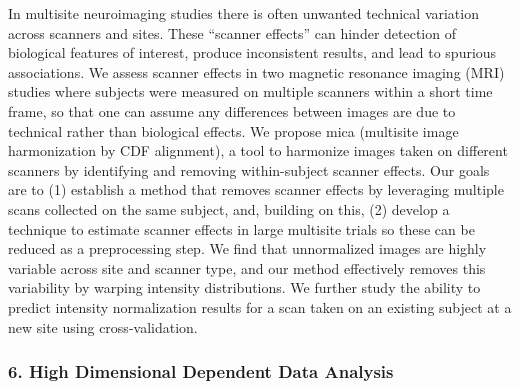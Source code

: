 \begin{itemize}
In multisite neuroimaging studies there is often unwanted technical variation across scanners and sites. These “scanner effects” can hinder detection of biological features of interest, produce inconsistent results, and lead to spurious associations. We assess scanner effects in two magnetic resonance imaging (MRI) studies where subjects were measured on multiple scanners within a short time frame, so that one can assume any differences between images are due to technical rather than biological effects. We propose mica (multisite image harmonization by CDF alignment), a tool to harmonize images taken on different scanners by identifying and removing within-subject scanner effects. Our goals are to (1) establish a method that removes scanner effects by leveraging multiple scans collected on the same subject, and, building on this, (2) develop a technique to estimate scanner effects in large multisite trials so these can be reduced as a preprocessing step. We find that unnormalized images are highly variable across site and scanner type, and our method effectively removes this variability by warping intensity distributions. We further study the ability to predict intensity normalization results for a scan taken on an existing subject at a new site using cross-validation.

\end{itemize}

\subsubsection*{6. High Dimensional Dependent Data Analysis}

